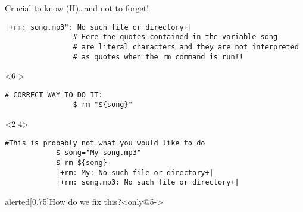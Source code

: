 \begin{frame}[fragile]{Crucial to know (II)}{\ldots{}and not to forget!}
\begin{overlayarea}{\textwidth}{0.5\textheight}
\begin{onlyenv}
\begin{lstlisting}[style=MyBash]
                |+rm: song.mp3": No such file or directory+|
                # Here the quotes contained in the variable song
                # are literal characters and they are not interpreted
                # as quotes when the rm command is run!!
            \end{lstlisting}
        \end{onlyenv}
        \begin{onlyenv}<6->
            \begin{lstlisting}[style=MyBash, firstnumber=9]
                # CORRECT WAY TO DO IT:
                $ rm "${song}"
            \end{lstlisting}
        \end{onlyenv}
    \end{overlayarea}
    \begin{onlyenv}<2-4>
        \begin{lstlisting}[style=MyBash]
            #This is probably not what you would like to do
            $ song="My song.mp3"
            $ rm ${song}
            |+rm: My: No such file or directory+|
            |+rm: song.mp3: No such file or directory+|
        \end{lstlisting}
    \end{onlyenv}
    \medskip
    \begin{varblock}{alerted}[0.75\textwidth]{How do we fix this?}<only@5->
    \end{varblock}
    
\end{frame}




